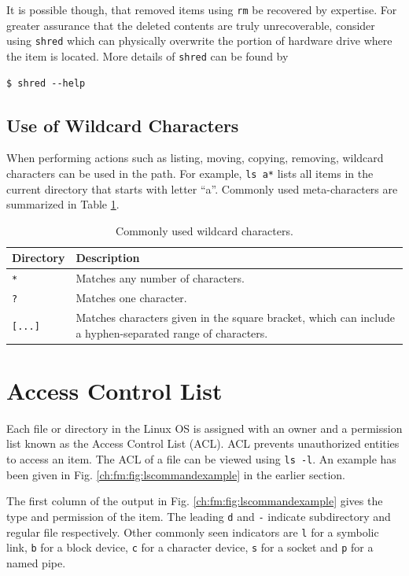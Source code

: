 It is possible though, that removed items using \verb|rm| be recovered by expertise. For greater assurance that the deleted contents are truly unrecoverable, consider using \verb|shred| which can physically overwrite the portion of hardware drive where the item is located. More details of \verb|shred| can be found by
\begin{lstlisting}
$ shred --help
\end{lstlisting}

\subsection{Use of Wildcard Characters}

When performing actions such as listing, moving, copying, removing, wildcard characters can be used in the path. For example, \verb|ls a*| lists all items in the current directory that starts with letter ``a''. Commonly used meta-characters are summarized in Table \ref{ch:fm:tab:metacharacters}.

\begin{table}
  \centering \caption{Commonly used wildcard characters.}\label{ch:fm:tab:metacharacters}
  \begin{tabularx}{\textwidth}{lX}
    \hline
    Directory & Description \\ \hline
    \verb|*| & Matches any number of characters. \\ 
    \verb|?| & Matches one character. \\ 
    \verb|[...]| & Matches characters given in the square bracket, which can include a hyphen-separated range of characters. \\
    \hline
  \end{tabularx}
\end{table}

\section{Access Control List} \label{ch:fm:sec:accesscontrollist}

Each file or directory in the Linux OS is assigned with an owner and a permission list known as the Access Control List (ACL). ACL prevents unauthorized entities to access an item. The ACL of a file can be viewed using \verb|ls -l|. An example has been given in Fig. \ref{ch:fm:fig:lscommandexample} in the earlier section.

The first column of the output in Fig. \ref{ch:fm:fig:lscommandexample} gives the type and permission of the item. The leading \verb|d| and \verb|-| indicate subdirectory and regular file respectively. Other commonly seen indicators are \verb|l| for a symbolic link, \verb|b| for a block device, \verb|c| for a character device, \verb|s| for a socket and \verb|p| for a named pipe.

